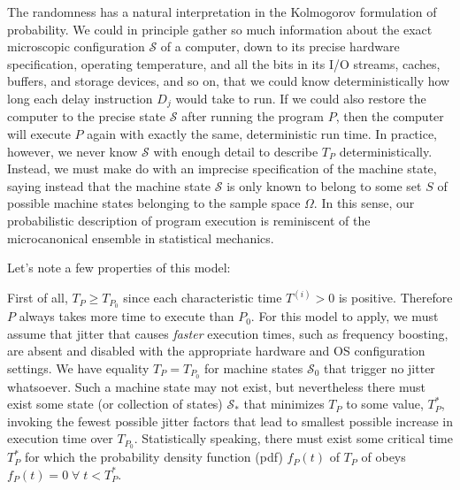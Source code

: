 \documentclass[conference]{IEEEtran}
\begin{document}
The randomness has a natural interpretation in the Kolmogorov formulation of probability. We could in principle gather so much information about the exact microscopic configuration $\mathcal S$ of a computer, down to its precise hardware specification, operating temperature, and all the bits in its I/O streams, caches, buffers, and storage devices, and so on, that we could know deterministically how long each delay instruction $D_j$ would take to run. If we could also restore the computer to the precise state $\mathcal S$ after running the program $P$, then the computer will execute $P$ again with exactly the same, deterministic run time. In practice, however, we never know $\mathcal S$ with enough detail to describe $T_P$ deterministically. Instead, we must make do with an imprecise specification of the machine state, saying instead that the machine state $\mathcal S$ is only known to belong to some set $S$ of possible machine states belonging to the sample space $\Omega$. In this sense, our probabilistic description of program execution is reminiscent of the microcanonical ensemble in statistical mechanics.

Let's note a few properties of this model:

First of all, $T_P \ge T_{P_0}$ since each characteristic time $T^{(i)} > 0$ is positive. Therefore $P$ always takes more time to execute than $P_0$.
For this model to apply, we must assume that jitter that causes \textit{faster}
execution times, such as frequency boosting, are absent and disabled with the
appropriate hardware and OS configuration settings. We have equality $T_P = T_{P_0}$
for machine states $\mathcal S_0$ that trigger no jitter whatsoever. Such a machine state may not exist, but nevertheless there must exist some state (or collection of states) $\mathcal S_*$ that minimizes $T_P$ to some value, $T^*_P$, invoking the fewest possible jitter factors that lead to smallest possible increase in execution time over $T_{P_0}$.
Statistically speaking, there must exist some critical time $T^*_P$ for which the probability density function (pdf) $f_P(t)$ of $T_P$ of obeys $f_P(t) = 0 \; \forall \; t < T^*_P$.
\end{document}
